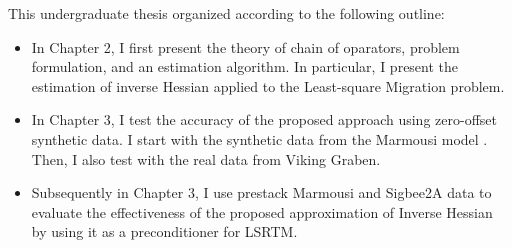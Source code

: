 This undergraduate thesis organized according to the following outline:
 
\begin{itemize}

\item In Chapter 2, I first present the theory of chain of oparators, problem formulation, and an estimation algorithm. In particular, I present the estimation of inverse Hessian applied to the Least-square Migration problem. 

\item In Chapter 3, I test the accuracy of the proposed approach using zero-offset synthetic data. I start with the synthetic data from the Marmousi model \cite[]{versteeg1994}. Then, I also test with the real data from Viking Graben. 

\item Subsequently in Chapter 3, I use prestack Marmousi and Sigbee2A data to evaluate the effectiveness of the proposed approximation of Inverse Hessian by using it as a preconditioner for LSRTM.
\end{itemize}
